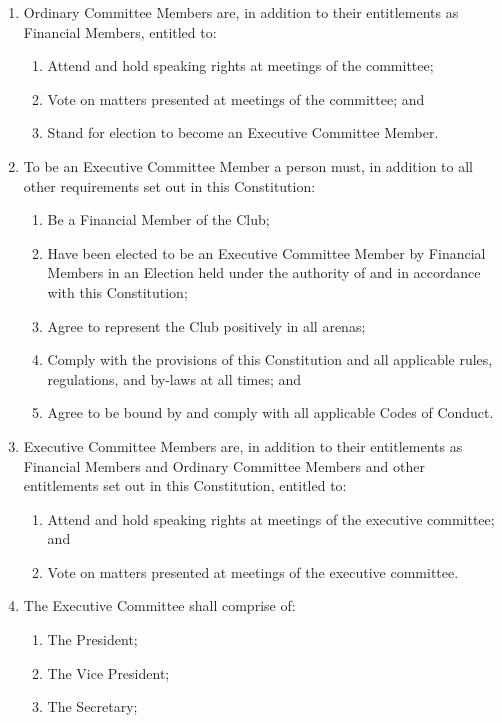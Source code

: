 \documentclass[12pt]{article}
\begin{document}
\begin{enumerate}[label=4.\arabic*]
    \item Ordinary Committee Members are, in addition to their entitlements as Financial Members, entitled to:
    \begin{enumerate}[label=\alph*.]
        \item Attend and hold speaking rights at meetings of the committee;
        \item Vote on matters presented at meetings of the committee; and
        \item Stand for election to become an Executive Committee Member.
    \end{enumerate}
    \item To be an Executive Committee Member a person must, in addition to all other requirements set out in this Constitution:
    \begin{enumerate}[label=\alph*.]
        \item Be a Financial Member of the Club;
        \item Have been elected to be an Executive Committee Member by Financial Members in an Election held under the authority of and in accordance with this Constitution;
        \item Agree to represent the Club positively in all arenas;
        \item Comply with the provisions of this Constitution and all applicable rules, regulations, and by-laws at all times; and
        \item Agree to be bound by and comply with all applicable Codes of Conduct.
    \end{enumerate}
    \item Executive Committee Members are, in addition to their entitlements as Financial Members and Ordinary Committee Members and other entitlements set out in this Constitution, entitled to:
    \begin{enumerate}[label=\alph*.]
        \item Attend and hold speaking rights at meetings of the executive committee; and
        \item Vote on matters presented at meetings of the executive committee.
    \end{enumerate}
    \item The Executive Committee shall comprise of:
    \begin{enumerate}[label=\alph*.]
        \item The President;
        \item The Vice President;
        \item The Secretary;

\end{enumerate}
\end{enumerate}
\end{document}

